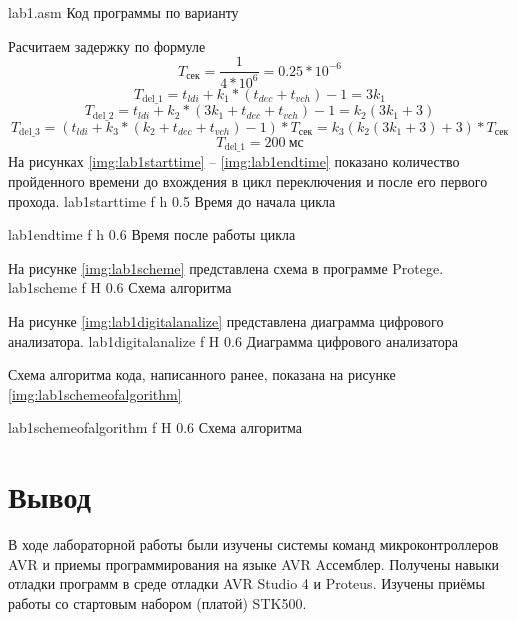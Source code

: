 \documentclass{bmstu}
\begin{document}
    {lab1.asm}
    {Код программы по варианту}
    
Расчитаем задержку по формуле
\[T_{\text{сек}} = \frac{1}{4 * 10^{6}} = 0.25 * 10^{-6}\]
\[T_{\text{del\_1}} = t_{ldi} + k_1 *(t_{dec} + t_{vch}) - 1 = 3k_1\]
\[T_{\text{del\_2}} = t_{ldi} + k_2 *(3k_1 + t_{dec} + t_{vch}) - 1 = k_2(3k_1 + 3)\]
\[T_{\text{del\_3}} = (t_{ldi} + k_3 *(k_2 + t_{dec} + t_{vch}) - 1) * T_{\text{сек}} = k_3(k_2(3k_1 + 3) +3) * T_{\text{сек}}\]
\[T_{\text{del\_1}} = 200~\text{мс}\]
На рисунках \ref{img:lab1starttime} -- \ref{img:lab1endtime} показано количество пройденного времени до вхождения в цикл переключения и после его первого прохода.
    {lab1starttime} %
    {f} %
    {h} %
    {0.5\textwidth} %
    {Время до начала цикла} %

    {lab1endtime} %
    {f} %
    {h} %
    {0.6\textwidth} %
    {Время после работы цикла} %
    
На рисунке \ref{img:lab1scheme} представлена схема в программе Protege.
    {lab1scheme} %
    {f} %
    {H} %
    {0.6\textwidth} %
    {Схема алгоритма} %
    
На рисунке \ref{img:lab1digitalanalize} представлена диаграмма цифрового анализатора.
    {lab1digitalanalize} %
    {f} %
    {H} %
    {0.6\textwidth} %
    {Диаграмма цифрового анализатора} %

\newpage
Схема алгоритма кода, написанного ранее, показана на рисунке \ref{img:lab1schemeofalgorithm}

    {lab1schemeofalgorithm} %
    {f} %
    {H} %
    {0.6\textwidth} %
    {Схема алгоритма} %

\section{Вывод}
В ходе лабораторной работы были изучены системы команд микроконтроллеров AVR и
приемы программирования на языке AVR Aссемблер. Получены навыки
отладки программ в среде отладки AVR Studio 4 и Proteus. Изучены приёмы
работы со стартовым набором (платой) STK500.
\newpage
\end{document}
